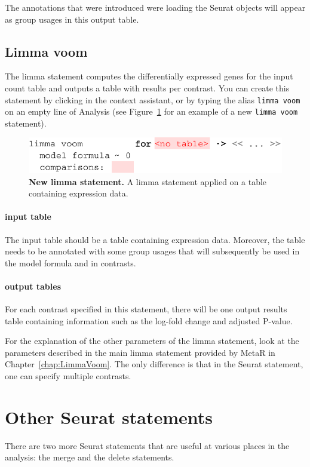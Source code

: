 The annotations that were introduced were loading the Seurat objects will appear as group
usages in this output table.

\subsection{Limma voom}
The limma statement computes the differentially expressed genes for the input count table and outputs
a table with results per contrast. You can create this statement by clicking
 in the context assistant, or by typing
the alias \texttt{limma voom} on an empty line of Analysis (see Figure~\ref{fig:LimmaSeurat}
for an example of a new \texttt{limma voom} statement).

\begin{figure}[h!tbp]
  \centering
    \includegraphics[width=\figWidthWide]{figures/LimmaSeurat.pdf}
    \caption[New limma statement.]{\textbf{New limma statement.} A limma statement applied on
    a table containing expression data.}
\label{fig:LimmaSeurat}
\end{figure}

\paragraph{input table} The input table should be a table containing expression data. Moreover,
the table needs to be annotated with some group usages that will subsequently be used in the
model formula and in contrasts.

\paragraph{output tables} For each contrast specified in this statement, there will be one
output results table containing information such as the log-fold change and adjusted P-value.

For the explanation of the other parameters of the limma statement, look at the parameters described in the
main limma statement provided by MetaR in Chapter~\ref{chap:LimmaVoom}. The only difference is that
in the Seurat statement, one can specify multiple contrasts.

\section{Other Seurat statements}\label{sec:OtherSeuratStatements}
There are two more Seurat statements that are useful at various places in the analysis: the
merge and the delete statements.

